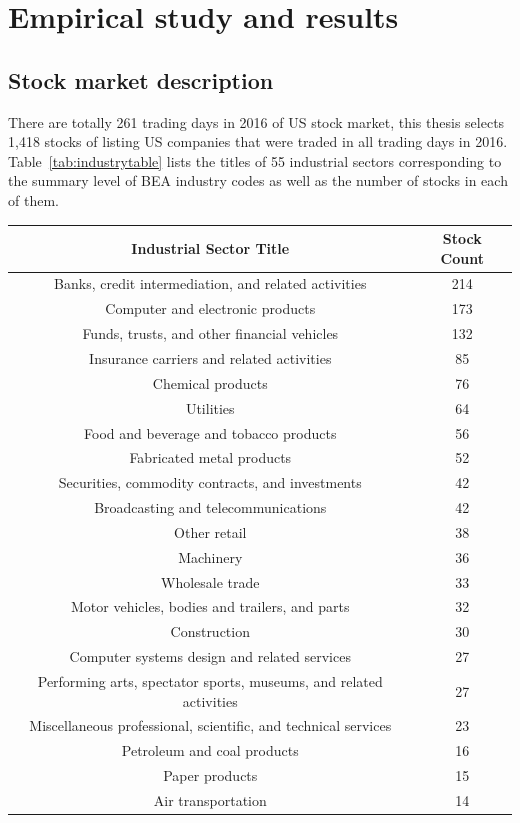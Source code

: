 \chapter{Empirical study and results}
\label{cpt:result}
\section{Stock market description}
There are totally 261 trading days in 2016 of US stock market, this thesis selects 1,418 stocks of listing US companies that were traded in all trading days in 2016. Table~\ref{tab:industrytable} lists the titles of 55 industrial sectors corresponding to the summary level of BEA industry codes as well as the number of stocks in each of them.
\begin{longtable}{c|c} 
	\centering
	\textbf{Industrial Sector Title} & \textbf{Stock Count}  \\ \hline
	Banks, credit intermediation, and related activities & 214 \\ 
	Computer and electronic products & 173 \\
	Funds, trusts, and other financial vehicles	& 132\\
	Insurance carriers and related activities & 85 \\
	Chemical products & 76 \\
	Utilities & 64 \\
	Food and beverage and tobacco products	& 56 \\
	Fabricated metal products & 52 \\
	Securities, commodity contracts, and investments & 42 \\
	Broadcasting and telecommunications	& 42 \\
	Other retail & 38 \\
	Machinery&	36 \\
	Wholesale trade & 33 \\
	Motor vehicles, bodies and trailers, and parts & 32 \\
	Construction & 30 \\
	Computer systems design and related services & 27 \\
	Performing arts, spectator sports, museums, and related activities & 27 \\
	Miscellaneous professional, scientific, and technical services & 23 \\
	Petroleum and coal products & 16 \\
	Paper products & 15 \\
	Air transportation & 14 \\

\end{longtable}
